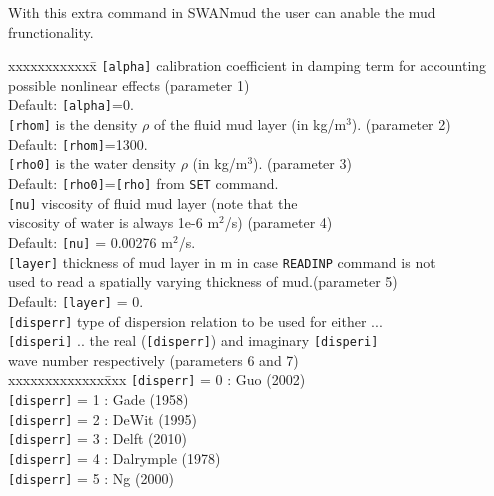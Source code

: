 \documentclass[12pt]{book}
\begin{document}
\noindent
With this extra command in SWANmud the user can anable the mud frunctionality.
\begin{tabbing}
xxxxxxxxxxxx\= \kill
{\tt [alpha]} \>   calibration coefficient in damping term for accounting \+\\
                   possible nonlinear effects (parameter 1)\\
                   Default: {\tt [alpha]}=0.\-\\
{\tt [rhom]} \>    is the density $\rho$ of the fluid mud layer (in kg/m$^3$). (parameter 2)\+\\
                   Default: {\tt [rhom]}=1300.\-\\
{\tt [rho0]}    \> is the water density $\rho$ (in kg/m$^3$). (parameter 3)\+\\
                   Default: {\tt [rho0]}={\tt [rho]} from {\tt SET} command.\-\\
{\tt [nu]} \>      viscosity of fluid mud layer (note that the \+\\
                   viscosity of water is always 1e-6 m$^2$/s) (parameter 4)\\
                   Default: {\tt [nu]} = 0.00276 m$^2$/s.\-\\
{\tt [layer]} \>   thickness of mud layer in m in case {\tt READINP} command is not\+\\
                   used to read a spatially varying thickness of mud.(parameter 5)\\
                   Default: {\tt [layer]} = 0.\-\\
{\tt [disperr]} \> type of dispersion relation to be used for either ...\\
{\tt [disperi]} \> .. the real ({\tt [disperr]}) and imaginary {\tt [disperi]}  \+\\
                   wave number respectively (parameters 6 and 7)\\
                   \pushtabs
                   xxxxxxxxxxxxx\=xxx \kill
                   {\tt [disperr]} = 0 \>: Guo (2002)\\
                   {\tt [disperr]} = 1 \>: Gade (1958)\\
                   {\tt [disperr]} = 2 \>: DeWit (1995)\\
                   {\tt [disperr]} = 3 \>: Delft (2010)\\
                   {\tt [disperr]} = 4 \>: Dalrymple (1978)\\
                   {\tt [disperr]} = 5 \>: Ng (2000)\\

\end{tabbing}
\end{document}
